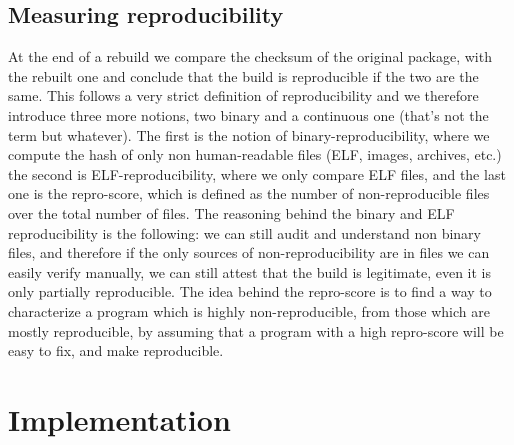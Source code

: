 \documentclass[a4paper,11pt,oneside]{report}
\theoremstyle{definition}
\begin{document}
\section{Measuring reproducibility}
At the end of a rebuild we compare the checksum of the original package, with the
rebuilt one and conclude that the build is reproducible if the two are the
same. This follows a very strict definition of reproducibility and we therefore
introduce three more notions, two binary and a continuous one (that's not the
term but whatever). The first is the notion of binary-reproducibility, where we
compute the hash of only non human-readable files (ELF, images, archives, etc.)
the second is ELF-reproducibility, where we only compare ELF files, and the
last one is the repro-score, which is defined as the number of non-reproducible
files over the total number of files.
The reasoning behind the binary and ELF reproducibility is the following: we
can still audit and understand non binary files, and therefore if the only
sources of non-reproducibility are in files we can easily verify manually, we
can still attest that the build is legitimate, even it is only partially
reproducible.
The idea behind the repro-score is to find a way to characterize a program
which is highly non-reproducible, from those which are mostly reproducible, by
assuming that a program with a high repro-score will be easy to fix, and make
reproducible.



\chapter{Implementation}
\end{document}
